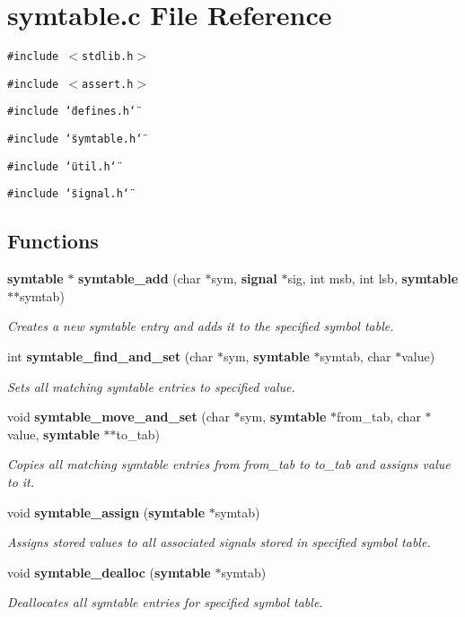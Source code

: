 \section{symtable.c File Reference}
\label{symtable_8c}
{\tt \#include $<$stdlib.h$>$}\par
{\tt \#include $<$assert.h$>$}\par
{\tt \#include \char`\"{}defines.h\char`\"{}}\par
{\tt \#include \char`\"{}symtable.h\char`\"{}}\par
{\tt \#include \char`\"{}util.h\char`\"{}}\par
{\tt \#include \char`\"{}signal.h\char`\"{}}\par
\subsection*{Functions}
\begin{CompactItemize}
\item 
{\bf symtable} $\ast$ {\bf symtable\_\-add} (char $\ast$sym, {\bf signal} $\ast$sig, int msb, int lsb, {\bf symtable} $\ast$$\ast$symtab)
\begin{CompactList}\small\item\em Creates a new symtable entry and adds it to the specified symbol table.\item\end{CompactList}\item 
int {\bf symtable\_\-find\_\-and\_\-set} (char $\ast$sym, {\bf symtable} $\ast$symtab, char $\ast$value)
\begin{CompactList}\small\item\em Sets all matching symtable entries to specified value.\item\end{CompactList}\item 
void {\bf symtable\_\-move\_\-and\_\-set} (char $\ast$sym, {\bf symtable} $\ast$from\_\-tab, char $\ast$value, {\bf symtable} $\ast$$\ast$to\_\-tab)
\begin{CompactList}\small\item\em Copies all matching symtable entries from from\_\-tab to to\_\-tab and assigns value to it.\item\end{CompactList}\item 
void {\bf symtable\_\-assign} ({\bf symtable} $\ast$symtab)
\begin{CompactList}\small\item\em Assigns stored values to all associated signals stored in specified symbol table.\item\end{CompactList}\item 
void {\bf symtable\_\-dealloc} ({\bf symtable} $\ast$symtab)
\begin{CompactList}\small\item\em Deallocates all symtable entries for specified symbol table.\item\end{CompactList}\end{CompactItemize}


